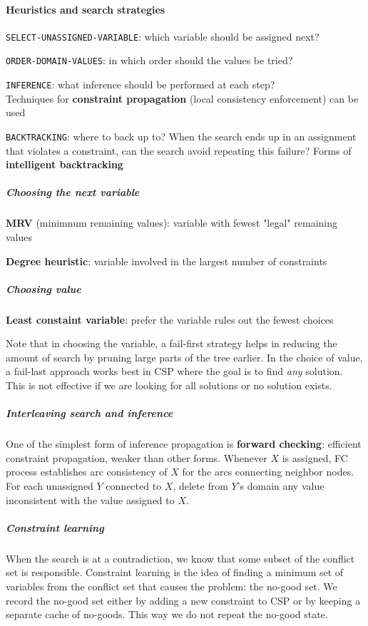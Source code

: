 \documentclass[10pt]{report}
\begin{document}
\paragraph{Heuristics and search strategies}
\begin{list}{}{}
	\item \texttt{SELECT-UNASSIGNED-VARIABLE}: which variable should be assigned next?
	\item \texttt{ORDER-DOMAIN-VALUES}: in which order should the values be tried?
	\item \texttt{INFERENCE}: what inference should be performed at each step?\\
	Techniques for \textbf{constraint propagation} (local consistency enforcement) can be used
	\item \texttt{BACKTRACKING}: where to back up to? When the search ends up in an assignment that violates a constraint, can the search avoid repeating this failure? Forms of \textbf{intelligent backtracking}
\end{list}
\subparagraph{Choosing the next variable}\begin{list}{}{}
	\item \textbf{MRV} (minimnum remaining values): variable with fewest "legal" remaining values
	\item \textbf{Degree heuristic}: variable involved in the largest number of constraints
\end{list}
\subparagraph{Choosing value} \begin{list}{}{}
	\item \textbf{Least constaint variable}: prefer the variable rules out the fewest choices
\end{list}
Note that in choosing the variable, a fail-first strategy helps in reducing the amount of search by pruning large parts of the tree earlier. In the choice of value, a fail-last approach works best in CSP where the goal is to find \textit{any} solution. This is not effective if we are looking for all solutions or no solution exists.
\subparagraph{Interleaving search and inference} One of the simplest form of inference propagation is \textbf{forward checking}: efficient constraint propagation, weaker than other forms. Whenever $X$ is assigned, FC process establishes arc consistency of $X$ for the arcs connecting neighbor nodes. For each unassigned $Y$ connected to $X$, delete from $Y$'s domain any value inconsistent with the value assigned to $X$.
\subparagraph{Constraint learning} When the search is at a contradiction, we know that some subset of the conflict set is responsible. Constraint learning is the idea of finding a minimum set of variables from the conflict set that causes the problem: the no-good set. We record the no-good set either by adding a new constraint to CSP or by keeping a separate cache of no-goods. This way we do not repeat the no-good state.
\end{document}
